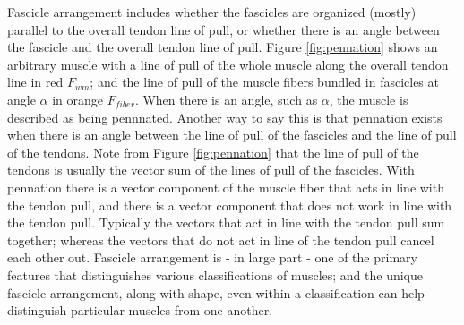 Fascicle arrangement includes whether the fascicles are organized (mostly) parallel to the overall tendon line of pull, or whether there is an angle between the fascicle and the overall tendon line of pull. Figure \ref{fig:pennation} shows an arbitrary muscle with a line of pull of the whole muscle along the overall tendon line in red $F_{wm}$; and the line of pull of the muscle fibers bundled in fascicles at angle $\alpha$ in orange $F_{fiber}$. When there is an angle, such as $\alpha$, the muscle is described as being pennnated. Another way to say this is that pennation exists when there is an angle between the line of pull of the fascicles and the line of pull of the tendons.\footnotemark{} Note from Figure \ref{fig:pennation} that the line of pull of the tendons is usually the vector sum of the lines of pull of the fascicles. With pennation there is a vector component of the muscle fiber that acts in line with the tendon pull, and there is a vector component that does not work in line with the tendon pull. Typically the vectors that act in line with the tendon pull sum together; whereas the vectors that do not act in line of the tendon pull cancel each other out.\footnotemark{}  Fascicle arrangement is - in large part - one of the primary features that distinguishes various classifications of muscles; and the unique fascicle arrangement, along with shape, even within a classification can help distinguish particular muscles from one another.


